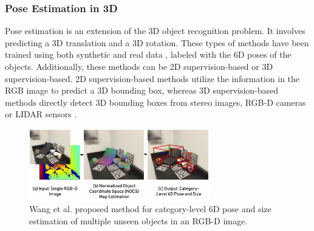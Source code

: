 \subsubsection{Pose Estimation in 3D}
Pose estimation is an extension of the 3D object recognition problem. It involves predicting a 3D translation and a 3D rotation. These types of methods have been trained using both synthetic \cite{gupta2015aligning} and real data \cite{li2019gs3d}, labeled with the 6D poses of the objects. Additionally, these methods can be 2D supervision-based or 3D supervision-based. 2D supervision-based methods utilize the information in the RGB image to predict a 3D bounding box, whereas 3D supervision-based methods directly detect 3D bounding boxes from stereo images, RGB-D cameras or LIDAR sensors \cite{sahin2020review}. 
\begin{figure}[!ht]
        \centering
        \includegraphics[width=0.7\textwidth]{images/wang-pose}
        \caption{Wang et al. proposed method for category-level 6D pose and
size estimation of multiple unseen objects in an RGB-D image.}
        \label{fig:wang-pose}
    \end{figure}
    

